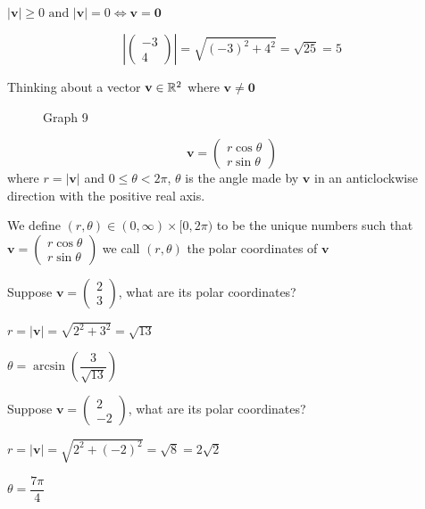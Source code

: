 \documentclass[10pt, a4paper]{article}
\newcommand{\mbf}[1]{\mathbf{#1}}
\begin{document}
$|\mbf{v}| \geq 0 \text{ and } |\mbf{v}| = 0 \iff \mbf{v = 0}$

\begin{example}
    \[
    \left|\begin{pmatrix}
        -3 \\
        4
    \end{pmatrix}\right|
    = \sqrt{(-3) ^ 2 + 4 ^ 2} = \sqrt{25} = 5
    \]
\end{example}

Thinking about a vector $\mbf{v} \in \R ^ 2$ where $\mbf{v \neq 0}$
\begin{figure}[H]
    \centering
    \caption{Graph 9}
    \label{fig:Gr9}
\end{figure}

\[
\mbf{v}  = \begin{pmatrix}
    r\cos\theta \\
    r\sin\theta
\end{pmatrix}
\]
where
$r = |\mbf{v}|$ and $0 \leq \theta < 2\pi$, $\theta$ is the angle made by $\mbf{v}$ in an anticlockwise direction with the positive real axis.

We define $(r, \theta) \in (0, \infty) \times [0, 2\pi)$
to be the unique numbers such that
$\mbf{v}  = \begin{pmatrix}
    r\cos\theta \\
    r\sin\theta
\end{pmatrix}$
we call $(r, \theta)$ the polar coordinates of $\mbf{v}$

\begin{example}
    Suppose $\mbf{v} = \begin{pmatrix}
        2 \\
        3
    \end{pmatrix}$,
    what are its polar coordinates?

    $r = |\mbf{v}| = \sqrt{2 ^ 2 + 3 ^ 2} = \sqrt{13}$

    $\theta = \arcsin \left({\dfrac{3}{\sqrt{13}}}\right)$
\end{example}

\begin{example}
    Suppose $\mbf{v} = \begin{pmatrix}
        2 \\
        -2
    \end{pmatrix}$,
    what are its polar coordinates?

    $r = |\mbf{v}| = \sqrt{2 ^ 2 + (-2) ^ 2} = \sqrt{8} = 2\sqrt{2}$

    $\theta = \dfrac{7\pi}{4}$
\end{example}
\end{document}
